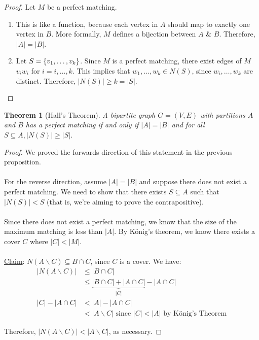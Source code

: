 \documentclass[]{article}
\newtheorem*{theorem}{Theorem}
\theoremstyle{definition}
\newcommand{\lecture}[1]{\marginpar{{\footnotesize $\leftarrow$ \underline{#1}}}}
\DeclarePairedDelimiter{\set}{\lbrace}{\rbrace}
\begin{document}
			\begin{proof}
				Let $M$ be a perfect matching.
				\begin{enumerate}
					\item This is like a function, because each vertex in $A$ should map to exactly one vertex in $B$. More formally, $M$ defines a bijection between $A$ \& $B$. Therefore, $|A| = |B|$.
					\item Let $S = \set{v_1, \ldots, v_k}$. Since $M$ is a perfect matching, there exist edges of $M$ $v_i w_i$ for $i = i, \ldots, k$. This implies that $w_1, \ldots, w_k \in N(S)$, since $w_i, \ldots, w_k$ are distinct. Therefore, $|N(S)| \ge k = |S|$. \qedhere
				\end{enumerate}
			\end{proof}

			\begin{theorem}[Hall's Theorem]
				A bipartite graph $G = (V, E)$ with partitions $A$ and $B$ has a perfect matching if and only if $|A| = |B|$ and for all $S \subseteq A, |N(S)| \ge |S|$.
			\end{theorem}

			\begin{proof} \lecture{April 8, 2013}
				We proved the forwards direction of this statement in the previous proposition.
				\\ \\
				For the reverse direction, assume $|A| = |B|$ and suppose there does not exist a perfect matching. We need to show that there exists $S \subseteq A$ such that $|N(S)| < S$ (that is, we're aiming to prove the contrapositive).
				\\ \\
				Since there does not exist a perfect matching, we know that the size of the maximum matching is less than $|A|$. By K\"onig's theorem, we know there exists a cover $C$ where $|C| < |M|$.
				\\ \\
				\underline{Claim}: $N(A \backslash C) \subseteq B \cap C$, since $C$ is a cover. We have:
				\begin{align*}
					|N(A \backslash C)| &\le |B \cap C| \\
					&\le \underbrace{|B \cap C| + |A \cap C|}_{|C|} - |A \cap C| \\
					|C| - |A \cap C| &< |A| - |A \cap C| \\
					&< |A \backslash C| \text{ since } |C| < |A| \text{ by K\"onig's Theorem}
				\end{align*}

				Therefore, $|N(A \backslash C)| < |A \backslash C|$, as necessary.
			\end{proof}
\end{document}
